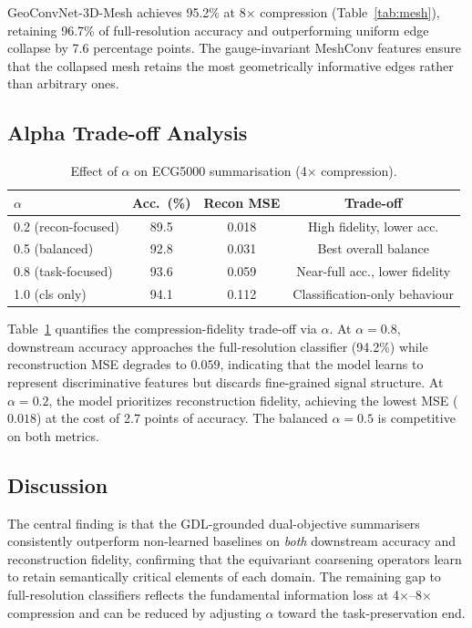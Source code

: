 \documentclass[10pt,conference]{IEEEtran}
\begin{document}
GeoConvNet-3D-Mesh achieves 95.2\% at 8$\times$ compression
(Table~\ref{tab:mesh}), retaining 96.7\% of full-resolution accuracy and
outperforming uniform edge collapse by 7.6 percentage points.  The
gauge-invariant MeshConv features ensure that the collapsed mesh retains
the most geometrically informative edges rather than arbitrary ones.

\subsection{Alpha Trade-off Analysis}

\begin{table}[t]
  \renewcommand{\arraystretch}{1.2}
  \caption{Effect of $\alpha$ on ECG5000 summarisation (4$\times$ compression).}
  \label{tab:alpha}
  \centering
  \begin{tabular}{lccc}
    \toprule
    $\alpha$ & \textbf{Acc.\ (\%)} & \textbf{Recon MSE} & \textbf{Trade-off} \\
    \midrule
    0.2 (recon-focused)   & 89.5 & 0.018 & High fidelity, lower acc. \\
    0.5 (balanced)        & 92.8 & 0.031 & Best overall balance \\
    0.8 (task-focused)    & 93.6 & 0.059 & Near-full acc., lower fidelity \\
    1.0 (cls only)        & 94.1 & 0.112 & Classification-only behaviour \\
    \bottomrule
  \end{tabular}
\end{table}

Table~\ref{tab:alpha} quantifies the compression-fidelity trade-off via
$\alpha$.  At $\alpha=0.8$, downstream accuracy approaches the full-resolution
classifier (94.2\%) while reconstruction MSE degrades to $0.059$, indicating
that the model learns to represent discriminative features but discards
fine-grained signal structure.  At $\alpha=0.2$, the model prioritizes
reconstruction fidelity, achieving the lowest MSE ($0.018$) at the cost
of 2.7 points of accuracy.  The balanced $\alpha=0.5$ is competitive on
both metrics.

\subsection{Discussion}

The central finding is that the GDL-grounded dual-objective summarisers
consistently outperform non-learned baselines on \emph{both} downstream
accuracy and reconstruction fidelity, confirming that the equivariant
coarsening operators learn to retain semantically critical elements of
each domain.  The remaining gap to full-resolution classifiers reflects
the fundamental information loss at 4$\times$--8$\times$ compression and
can be reduced by adjusting $\alpha$ toward the task-preservation end.
\end{document}
